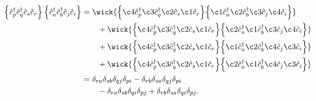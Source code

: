         \begin{align}
            \brac{
                \ccr{p}
                \ccr{q}
                \can{s}
                \can{r}
            }
            \brac{
                \ccr{a}
                \ccr{b}
                \can{j}
                \can{i}
            }
            &=
            \wick{
                \Big\{
                    \c4 {\ccr{p}}
                    \c3 {\ccr{q}}
                    \c2 {\can{s}}
                    \c1 {\can{r}}
                \Big\}
                \Big\{
                    \c1 {\ccr{a}}
                    \c2 {\ccr{b}}
                    \c3 {\can{j}}
                    \c4 {\can{i}}
                \Big\}
            }
            \nonumber \\
            &\qquad
            +
            \wick{
                \Big\{
                    \c4 {\ccr{p}}
                    \c3 {\ccr{q}}
                    \c2 {\can{s}}
                    \c1 {\can{r}}
                \Big\}
                \Big\{
                    \c2 {\ccr{a}}
                    \c1 {\ccr{b}}
                    \c3 {\can{j}}
                    \c4 {\can{i}}
                \Big\}
            }
            \nonumber \\
            &\qquad
            +
            \wick{
                \Big\{
                    \c4 {\ccr{p}}
                    \c3 {\ccr{q}}
                    \c2 {\can{s}}
                    \c1 {\can{r}}
                \Big\}
                \Big\{
                    \c1 {\ccr{a}}
                    \c2 {\ccr{b}}
                    \c4 {\can{j}}
                    \c3 {\can{i}}
                \Big\}
            }
            \nonumber \\
            &\qquad
            +
            \wick{
                \Big\{
                    \c4 {\ccr{p}}
                    \c3 {\ccr{q}}
                    \c2 {\can{s}}
                    \c1 {\can{r}}
                \Big\}
                \Big\{
                    \c2 {\ccr{a}}
                    \c1 {\ccr{b}}
                    \c4 {\can{j}}
                    \c3 {\can{i}}
                \Big\}
            }
            \\
            &=
            \delta_{ra}
            \delta_{sb}
            \delta_{qj}
            \delta_{pi}
            -
            \delta_{rb}
            \delta_{sa}
            \delta_{qj}
            \delta_{pi}
            \nonumber \\
            &\qquad
            -
            \delta_{ra}
            \delta_{sb}
            \delta_{qi}
            \delta_{pj}
            +
            \delta_{rb}
            \delta_{sa}
            \delta_{qi}
            \delta_{pj}.
        \end{align}
